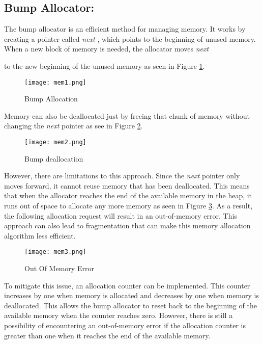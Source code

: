 \documentclass[12pt, letterpaper]{article}
\newcommand{\var}[1]{
   \textit{#1}
}
\begin{document}
\subsection{Bump Allocator:}

The bump allocator is an efficient method for managing memory. It works by creating a pointer called \var{next}, 
which points to the beginning of unused memory. When a new block of memory is needed, the allocator moves \var{next} 
to the new beginning of the unused memory as seen in Figure \ref{fig:mem1}.

\begin{figure}[H]
      \centering
      \texttt{[image: mem1.png]}
      \caption{Bump Allocation}
      \label{fig:mem1}
\end{figure}

Memory can also be deallocated just by freeing that chunk of memory without changing the \var{next} pointer as see 
in Figure \ref{fig:mem2}.

\begin{figure}[H]
      \centering
      \texttt{[image: mem2.png]}
      \caption{Bump deallocation}
      \label{fig:mem2}
\end{figure}

However, there are limitations to this approach. Since the \var{next} pointer only moves forward, it cannot reuse memory 
that has been deallocated. This means that when the allocator reaches the end of the available memory in the heap, 
it runs out of space to allocate any more memory as seen in Figure \ref{fig:mem3}. As a result, the following 
allocation request will result in an out-of-memory error. This approach can also lead to fragmentation that can 
make this memory allocation algorithm less efficient.

\begin{figure}[H]
      \centering
      \texttt{[image: mem3.png]}
      \caption{Out Of Memory Error}
      \label{fig:mem3}
\end{figure}

To mitigate this issue, an allocation counter can be implemented. This counter increases by one when memory is 
allocated and decreases by one when memory is deallocated. This allows the bump allocator to reset back to the 
beginning of the available memory when the counter reaches zero. However, there is still a possibility of 
encountering an out-of-memory error if the allocation counter is greater than one when it reaches the end of the 
available memory.
\end{document}
